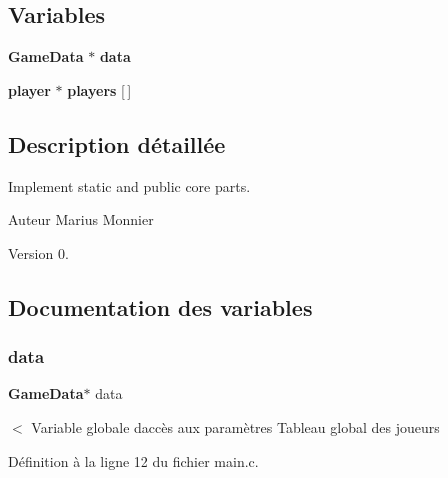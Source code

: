 \subsection*{Variables}
\begin{DoxyCompactItemize}
\item 
\textbf{ Game\+Data} $\ast$ \textbf{ data}
\item 
\mbox{\label{game__fonctions_8c_aa6e0d10ac9dacf902c351a3cbb8a474d}} 
\textbf{ player} $\ast$ {\bfseries players} [$\,$]
\end{DoxyCompactItemize}


\subsection{Description détaillée}
Implement static and public core parts. 

\begin{DoxyAuthor}{Auteur}
Marius Monnier 
\end{DoxyAuthor}
\begin{DoxyVersion}{Version}
0. 
\end{DoxyVersion}


\subsection{Documentation des variables}
\mbox{\label{game__fonctions_8c_a882ad77a7df764b098f98136eb56a83a}} 
\subsubsection{data}
{\footnotesize\ttfamily \textbf{ Game\+Data}$\ast$ data}

$<$ Variable globale d\textquotesingle{}accès aux paramètres Tableau global des joueurs 

Définition à la ligne 12 du fichier main.\+c.

